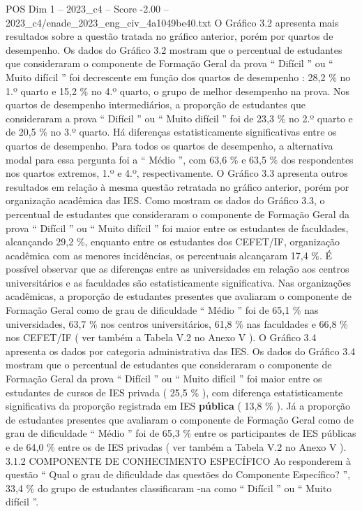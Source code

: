 \begin{textsample}{POS Dim 1 – 2023\_c4 – Score -2.00 – 2023\_c4/enade\_2023\_eng\_civ\_4a1049be40.txt}
O Gráfico 3.2 apresenta mais resultados sobre a questão tratada no gráfico anterior, porém por quartos de desempenho.
Os dados do Gráfico 3.2 mostram que o percentual de estudantes que consideraram o componente de Formação Geral da prova “ Difícil ” ou “ Muito difícil ” foi decrescente em função dos quartos de desempenho : 28,2 \% no 1.º quarto e 15,2 \% no 4.º quarto, o grupo de melhor desempenho na prova.
Nos quartos de desempenho intermediários, a proporção de estudantes que consideraram a prova “ Difícil ” ou “ Muito difícil ” foi de 23,3 \% no 2.º quarto e de 20,5 \% no 3.º quarto.
Há diferenças estatisticamente significativas entre os quartos de desempenho.
Para todos os quartos de desempenho, a alternativa modal para essa pergunta foi a “ Médio ”, com 63,6 \% e 63,5 \% dos respondentes nos quartos extremos, 1.º e 4.º, respectivamente.
O Gráfico 3.3 apresenta outros resultados em relação à mesma questão retratada no gráfico anterior, porém por organização acadêmica das IES.
Como mostram os dados do Gráfico 3.3, o percentual de estudantes que consideraram o componente de Formação Geral da prova “ Difícil ” ou “ Muito difícil ” foi maior entre os estudantes de faculdades, alcançando 29,2 \%, enquanto entre os estudantes dos CEFET/IF, organização acadêmica com as menores incidências, os percentuais alcançaram 17,4 \%.
É possível observar que as diferenças entre as universidades em relação aos centros universitários e as faculdades são estatisticamente significativa.
Nas organizações acadêmicas, a proporção de estudantes presentes que avaliaram o componente de Formação Geral como de grau de dificuldade “ Médio ” foi de 65,1 \% nas universidades, 63,7 \% nos centros universitários, 61,8 \% nas faculdades e 66,8 \% nos CEFET/IF ( ver também a Tabela V.2 no Anexo V ).
O Gráfico 3.4 apresenta os dados por categoria administrativa das IES.
Os dados do Gráfico 3.4 mostram que o percentual de estudantes que consideraram o componente de Formação Geral da prova “ Difícil ” ou “ Muito difícil ” foi maior entre os estudantes de cursos de IES privada ( 25,5 \% ), com diferença estatisticamente significativa da proporção registrada em IES \textbf{pública} ( 13,8 \% ).
Já a proporção de estudantes presentes que avaliaram o componente de Formação Geral como de grau de dificuldade “ Médio ” foi de 65,3 \% entre os participantes de IES públicas e de 64,0 \% entre os de IES privadas ( ver também a Tabela V.2 no Anexo V ). 3.1.2 COMPONENTE DE CONHECIMENTO ESPECÍFICO Ao responderem à questão “ Qual o grau de dificuldade das questões do Componente Específico? ”, 33,4 \% do grupo de estudantes classificaram -na como “ Difícil ” ou “ Muito difícil ”.

\end{textsample}
